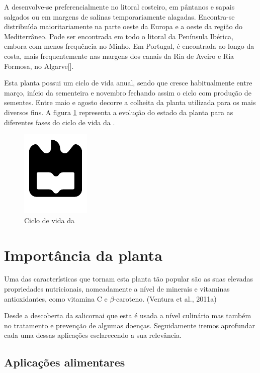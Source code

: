 A \sr desenvolve-se preferencialmente no litoral costeiro, em pântanos e sapais salgados ou em margens de salinas temporariamente alagadas. Encontra-se distribuída maioritariamente na parte oeste da Europa e a oeste da região do Mediterrâneo. Pode ser encontrada em todo o litoral da Península Ibérica, embora com menos frequência no Minho\cite{Silva2000}. Em Portugal, é encontrada ao longo da costa, mais frequentemente nas margens dos canais da Ria de Aveiro e Ria Formosa, no Algarve[]. 

Esta planta possui um ciclo de vida anual, sendo que cresce habitualmente entre março, início da sementeira e novembro fechando assim o ciclo com produção de sementes. Entre maio  e agosto decorre a colheita da planta\cite{RaquelPinto} utilizada para os mais diversos fins. A figura \ref{ciclodevida} representa a evolução do estado da planta para as diferentes fases do ciclo de vida da \sr. 

 \begin{figure}[!htb]
 	\centering
 	\includegraphics{uaLogoNew.pdf}
 	\caption{Ciclo de vida da \sr}
 	\label{ciclodevida}
 \end{figure}
 
 



\section{Importância da planta}


Uma das características que tornam esta planta tão popular são as suas elevadas propriedades nutricionais, nomeadamente a nível de minerais e vitaminas antioxidantes, como vitamina C e $\beta$-caroteno. (Ventura et al., 2011a)

Desde a descoberta da salicornai que esta é usada a nível culinário mas também no tratamento e prevenção de algumas doenças. Seguidamente iremos aprofundar cada uma dessas aplicações esclarecendo a sua relevância. 



\subsection{Aplicações alimentares}


